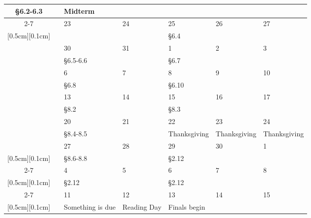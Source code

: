 \documentclass[10pt]{article}
\begin{document}
{\begin{tabular}{|c|c||p{2.9cm}|p{2.1cm}|p{2.9cm}|p{2.1cm}|p{2.1cm}|}
\S 6.2-6.3 & & \textbf{Midterm} & & \\\cline{2-7}
%
 & \multirow{2}{0.8cm}{\centering{9}} 
  & 23 & 24 & 25 & 26 & 27 \\ 
\raisebox{0cm}[0.5cm][0.1cm]{}&& 
 &  & \S 6.4  & & \\\hline
\multirow{8}{0.8cm}{\centering{Nov}} 
 & \multirow{2}{0.8cm}{\centering{10}} 
 & 30 & 31 & 1 & 2 & 3 \\ 
\raisebox{0cm}[0.5cm][0.1cm]{}&& 
\S 6.5-6.6 & & \S6.7 & & \\\cline{2-7}
%
 & \multirow{2}{0.8cm}{\centering{11}} 
  & 6 & 7 & 8 & 9 & 10 \\ 
\raisebox{0cm}[0.5cm][0.1cm]{}&& 
\S 6.8  & & \S6.10  & & \\\cline{2-7}
%
 & \multirow{2}{0.8cm}{\centering{12}} 
  & 13 & 14 & 15 & 16 & 17\\ 
\raisebox{0cm}[0.5cm][0.1cm]{}&& 
\S 8.2 & & \S8.3 & & \\\cline{2-7}
%
 & \multirow{2}{0.8cm}{\centering{13}} 
  & 20 & 21 & 22 & 23 & 24  \\ 
\raisebox{0cm}[0.5cm][0.1cm]{}&& 
\S 8.4-8.5 &  & Thanksgiving & Thanksgiving & Thanksgiving\\\hline
%
 & \multirow{2}{0.8cm}{\centering{14}} 
 & 27 & 28 & 29 & 30 & 1  \\ 
\raisebox{0cm}[0.5cm][0.1cm]{}&& 
\S8.6-8.8 & & \S 2.12 &  & \\\cline{2-7}
\multirow{3}{0.8cm}{\centering{Dec}} 
 & \multirow{2}{0.8cm}{\centering{15}} 
 & 4 & 5 & 6 & 7 & 8   \\ 
\raisebox{0cm}[0.5cm][0.1cm]{}&& 
\S 2.12 &  & \S 2.12  & & \\\cline{2-7}
%
 & \multirow{2}{0.8cm}{\centering{16}} 
 & 11 & 12 & 13 & 14 & 15 \\ 
\raisebox{0cm}[0.5cm][0.1cm]{}&& 
Something is due & Reading Day & Finals begin &  & \\\hline%
%
\end{tabular}}



\end{document}

